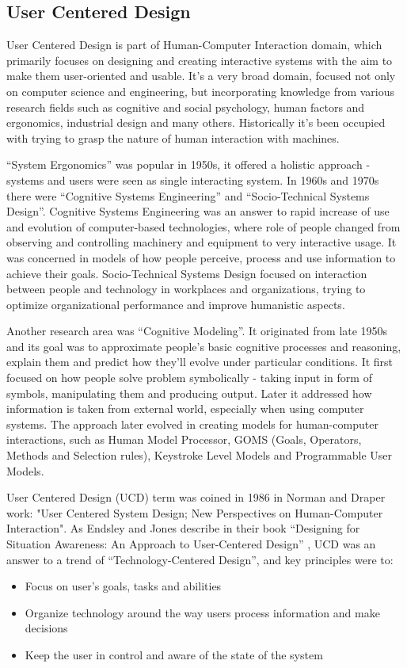 \documentclass{article}
\begin{document}
\subsection{User Centered Design}
User Centered Design is part of Human-Computer Interaction domain, which primarily focuses on designing and  creating interactive systems with the aim to make them user-oriented and usable. It's a very broad domain, focused not only on computer science and engineering, but incorporating knowledge from various research fields such as cognitive and social psychology, human factors and ergonomics, industrial design and many others. Historically it's been occupied with trying to grasp the nature of human interaction with machines. \cite{ritter2014user}

``System Ergonomics'' was popular in 1950s, it offered a holistic approach - systems and users were seen as single interacting system. In 1960s and 1970s there were ``Cognitive Systems Engineering'' and ``Socio-Technical Systems Design''. Cognitive Systems Engineering was an answer to rapid increase of use and evolution of computer-based technologies, where role of people changed from observing and controlling machinery and equipment to very interactive usage. It was concerned in models of how people perceive, process and use information to achieve their goals. Socio-Technical Systems Design focused on interaction between people and technology in workplaces and organizations, trying to optimize organizational performance and improve humanistic aspects.

Another research area was ``Cognitive Modeling''. It originated from late 1950s and its goal was to approximate people's basic cognitive processes and reasoning, explain them and predict how they'll evolve under particular conditions. It first focused on how people solve problem symbolically - taking input in form of symbols, manipulating them and producing output. Later it addressed how information is taken from external world, especially when using computer systems. The approach later evolved in creating models for human-computer interactions, such as Human Model Processor, GOMS (Goals, Operators, Methods and Selection rules), Keystroke Level Models and Programmable User Models.

User Centered Design (UCD) term was coined in 1986 in Norman and Draper work: "User Centered System Design; New Perspectives on Human-Computer Interaction". As Endsley and Jones describe in their book ``Designing for Situation Awareness: An Approach to User-Centered Design'' \cite{endsley2016designing}, UCD was an answer to a trend of ``Technology-Centered Design'', and key principles were to:
\begin{itemize}
    \item Focus on user's goals, tasks and abilities
    \item Organize technology around the way users process information and make decisions
    \item Keep the user in control and aware of the state of the system
\end{itemize}
\end{document}
